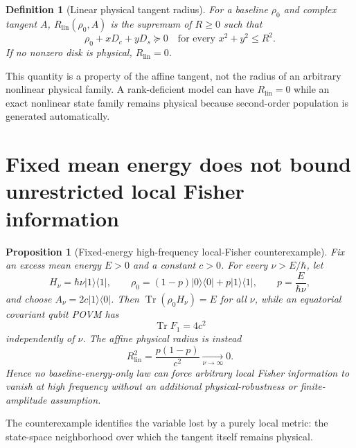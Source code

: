 \documentclass[aps,pra,preprint,nofootinbib]{revtex4-2}
\newtheorem{proposition}{Proposition}
\newtheorem{definition}{Definition}
\newcommand{\Tr}{\operatorname{Tr}}
\newcommand{\Rlin}{R_{\mathrm{lin}}}
\newcommand{\rhozero}{\rho_0}
\newcommand{\Fcl}{F}
\begin{document}
\begin{definition}[Linear physical tangent radius]
For a baseline $\rhozero$ and complex tangent $A$, $\Rlin(\rhozero,A)$ is the supremum of $R\ge0$ such that
\begin{equation}
\rhozero+xD_c+yD_s\succeq0
\quad\text{for every }x^2+y^2\le R^2.
\label{eq:RlinDef}
\end{equation}
If no nonzero disk is physical, $\Rlin=0$.
\end{definition}

This quantity is a property of the affine tangent, not the radius of an arbitrary nonlinear physical family.  A rank-deficient model can have $\Rlin=0$ while an exact nonlinear state family remains physical because second-order population is generated automatically.

\section{Fixed mean energy does not bound unrestricted local Fisher information}
\label{sec:nogo}


\begin{proposition}[Fixed-energy high-frequency local-Fisher counterexample]
\label{prop:nogo}
Fix an excess mean energy $E>0$ and a constant $c>0$.  For every $\nu>E/\hbar$, let
\begin{equation}
H_\nu=\hbar\nu |1\rangle\!\langle1|,
\qquad
\rhozero=(1-p)|0\rangle\!\langle0|+p|1\rangle\!\langle1|,
\qquad
p=\frac{E}{\hbar\nu},
\end{equation}
and choose $A_\nu=2c|1\rangle\!\langle0|$.  Then $\Tr(\rhozero H_\nu)=E$ for all $\nu$, while an equatorial covariant qubit POVM has
\begin{equation}
\Tr \Fcl_1=4c^2
\end{equation}
independently of $\nu$.  The affine physical radius is instead
\begin{equation}
\Rlin^2=\frac{p(1-p)}{c^2}\xrightarrow[\nu\to\infty]{}0.
\end{equation}
Hence no baseline-energy-only law can force arbitrary local Fisher information to vanish at high frequency without an additional physical-robustness or finite-amplitude assumption.
\end{proposition}

The counterexample identifies the variable lost by a purely local metric: the state-space neighborhood over which the tangent itself remains physical.
\end{document}

